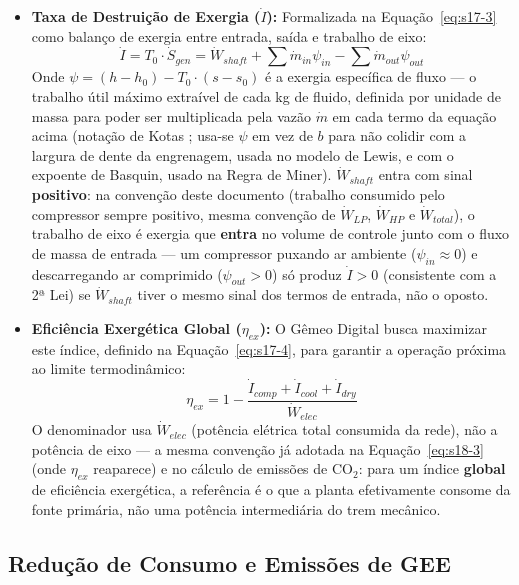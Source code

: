 \documentclass[12pt,a4paper]{article}
\numberwithin{equation}{section}
\numberwithin{table}{section}
\numberwithin{figure}{section}
\begin{document}
\begin{itemize}
	\item \textbf{Taxa de Destruição de Exergia ($\dot{I}$):} Formalizada na Equação~\eqref{eq:s17-3} como balanço de exergia entre entrada, saída e trabalho de eixo:
	\begin{equation}\label{eq:s17-3}
\dot{I} = T_0 \cdotp \dot{S}_{gen} = \dot{W}_{shaft} + \sum \dot{m}_{in} \psi_{in} - \sum \dot{m}_{out} \psi_{out}
\end{equation}
	Onde $\psi = (h - h_0) - T_0 \cdotp (s - s_0)$ é a exergia específica de fluxo — o trabalho útil máximo extraível de cada kg de fluido, definida por unidade de massa para poder ser multiplicada pela vazão $\dot{m}$ em cada termo da equação acima (notação de Kotas \cite{bejan}; usa-se $\psi$ em vez de $b$ para não colidir com a largura de dente da engrenagem, usada no modelo de Lewis, e com o expoente de Basquin, usado na Regra de Miner). $\dot{W}_{shaft}$ entra com sinal \textbf{positivo}: na convenção deste documento (trabalho consumido pelo compressor sempre positivo, mesma convenção de $\dot{W}_{LP}$, $\dot{W}_{HP}$ e $\dot{W}_{total}$), o trabalho de eixo é exergia que \textbf{entra} no volume de controle junto com o fluxo de massa de entrada — um compressor puxando ar ambiente ($\psi_{in}\approx0$) e descarregando ar comprimido ($\psi_{out}>0$) só produz $\dot{I}>0$ (consistente com a 2ª Lei) se $\dot{W}_{shaft}$ tiver o mesmo sinal dos termos de entrada, não o oposto.
	
	\item \textbf{Eficiência Exergética Global ($\eta_{ex}$):}
	O Gêmeo Digital busca maximizar este índice, definido na Equação~\eqref{eq:s17-4}, para garantir a operação próxima ao limite termodinâmico:
	\begin{equation}\label{eq:s17-4}
\eta_{ex} = 1 - \frac{\dot{I}_{comp} + \dot{I}_{cool} + \dot{I}_{dry}}{\dot{W}_{elec}}
\end{equation}
	O denominador usa $\dot{W}_{elec}$ (potência elétrica total consumida da rede), não a potência de eixo — a mesma convenção já adotada na Equação~\eqref{eq:s18-3} (onde $\eta_{ex}$ reaparece) e no cálculo de emissões de CO$_2$: para um índice \textbf{global} de eficiência exergética, a referência é o que a planta efetivamente consome da fonte primária, não uma potência intermediária do trem mecânico.
\end{itemize}

\subsection{Redução de Consumo e Emissões de GEE}
\end{document}
